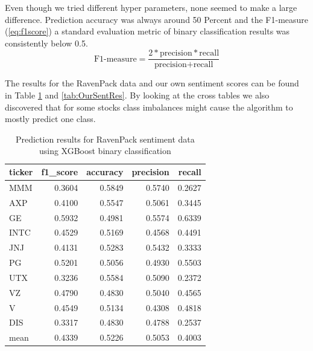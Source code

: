 Even though we tried different hyper parameters, none seemed to make a large difference. Prediction accuracy was always around 50 Percent and the F1-measure (\ref{eq:f1score}) a standard evaluation metric of binary classification results \citep{HADDI201326} was consistently below 0.5.
\begin{equation} 
    \text{F1-measure} = \frac{2*\text{precision} * \text{recall}}{\text{precision} + \text{recall}}
\end{equation}\label{eq:f1score}

The results for the RavenPack data and our own sentiment scores can be found in Table \ref{tab:RavSentRes} and \ref{tab:OurSentRes}. By looking at the cross tables we also discovered that for some stocks class imbalances might cause the algorithm to mostly predict one class. 
\begin{table}[h]
\centering
\footnotesize
\begin{tabular}{lrrrr}
\toprule
ticker &  f1\_score &  accuracy &  precision &    recall \\
\midrule
MMM    &  0.3604 &  0.5849 &   0.5740 &  0.2627 \\
AXP    &  0.4100 &  0.5547 &   0.5061 &  0.3445 \\
GE     &  0.5932 &  0.4981 &   0.5574 &  0.6339 \\
INTC   &  0.4529 &  0.5169 &   0.4568 &  0.4491 \\
JNJ    &  0.4131 &  0.5283 &   0.5432 &  0.3333 \\
PG     &  0.5201 &  0.5056 &   0.4930 &  0.5503 \\
UTX    &  0.3236 &  0.5584 &   0.5090 &  0.2372 \\
VZ     &  0.4790 &  0.4830 &   0.5040 &  0.4565 \\
V      &  0.4549 &  0.5134 &   0.4308 &  0.4818 \\
DIS    &  0.3317 &  0.4830 &   0.4788 &  0.2537 \\
\midrule
mean & 0.4339 & 0.5226 & 0.5053 & 0.4003 \\
\bottomrule
\end{tabular}
    \caption{Prediction results for RavenPack sentiment data using XGBoost binary classification}
    \label{tab:RavSentRes}
\end{table}
%
